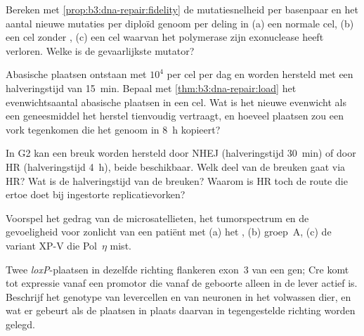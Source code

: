\begin{exercise}[$\star\star$]\label{exo:b3:dna-repair:5}
Bereken met \cref{prop:b3:dna-repair:fidelity} de mutatiesnelheid per
basenpaar en het aantal nieuwe mutaties per diploïd genoom per deling
in (a) een normale cel, (b) een cel zonder , (c) een cel
waarvan het polymerase zijn exonuclease heeft verloren. Welke is de
gevaarlijkste mutator?
\end{exercise}

\begin{exercise}[$\star\star$]\label{exo:b3:dna-repair:6}
Abasische plaatsen ontstaan met $10^{4}$ per cel per dag en worden
hersteld met een halveringstijd van \qty{15}{min}. Bepaal met
\cref{thm:b3:dna-repair:load} het evenwichtsaantal abasische plaatsen
in een cel. Wat is het nieuwe evenwicht als een geneesmiddel het
herstel tienvoudig vertraagt, en hoeveel plaatsen zou een vork
tegenkomen die het genoom in \qty{8}{h} kopieert?
\end{exercise}

\begin{exercise}[$\star\star$]\label{exo:b3:dna-repair:7}
In G2 kan een breuk worden hersteld door NHEJ (halveringstijd
\qty{30}{min}) of door HR (halveringstijd \qty{4}{h}), beide
beschikbaar. Welk deel van de breuken gaat via HR? Wat is de
halveringstijd van de breuken? Waarom is HR toch de route die ertoe
doet bij ingestorte replicatievorken?
\end{exercise}

\begin{exercise}[$\star\star$]\label{exo:b3:dna-repair:8}
Voorspel het gedrag van de microsatellieten, het tumorspectrum en de
gevoeligheid voor zonlicht van een patiënt met (a) het , (b)  groep~A, (c) de variant XP-V die
Pol~$\eta$ mist.
\end{exercise}

\begin{exercise}[$\star\star$]\label{exo:b3:dna-repair:9}
Twee \emph{loxP}-plaatsen in dezelfde richting flankeren exon~3 van een
gen; Cre komt tot expressie vanaf een promotor die vanaf de geboorte
alleen in de lever actief is. Beschrijf het genotype van levercellen en
van neuronen in het volwassen dier, en wat er gebeurt als de plaatsen
in plaats daarvan in tegengestelde richting worden gelegd.
\end{exercise}

